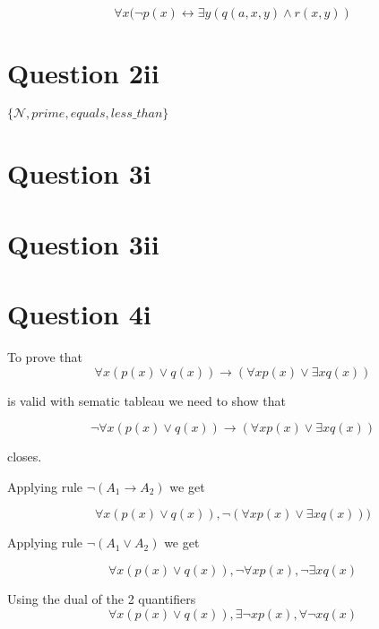 \documentclass[10pt,a4paper]{article}
\begin{document}
\begin{equation}
 \forall x(\neg p(x) \leftrightarrow \exists y(q(a,x,y) \wedge r(x,y))
\end{equation}

\section{Question 2ii}
$\{\mathscr{N},prime,equals,less\_than\}$


\section{Question 3i}



\section{Question 3ii}


\section{Question 4i}

To prove that 
\begin{equation}
 \forall x(p(x)\vee q(x)) \rightarrow (\forall x p(x)\vee\exists x q(x))
\end{equation}

is valid with sematic tableau we need to show that 

\begin{equation}
 \neg \forall x(p(x)\vee q(x)) \rightarrow (\forall x p(x)\vee\exists x q(x))
\end{equation}

closes. 

Applying rule $\neg(A_1\rightarrow A_2)$ we get

\begin{equation}
 \forall x(p(x)\vee q(x)),\neg(\forall x p(x)\vee\exists x q(x)))
\end{equation}

Applying rule $\neg(A_1 \vee A_2)$ we get

\begin{equation}
 \forall x(p(x)\vee q(x)),\neg\forall xp(x),\neg\exists xq(x)
\end{equation}

Using the dual of the 2 quantifiers
\
\begin{equation}
 \forall x(p(x)\vee q(x)),\exists\neg xp(x),\forall\neg xq(x)
\end{equation}
\end{document}
